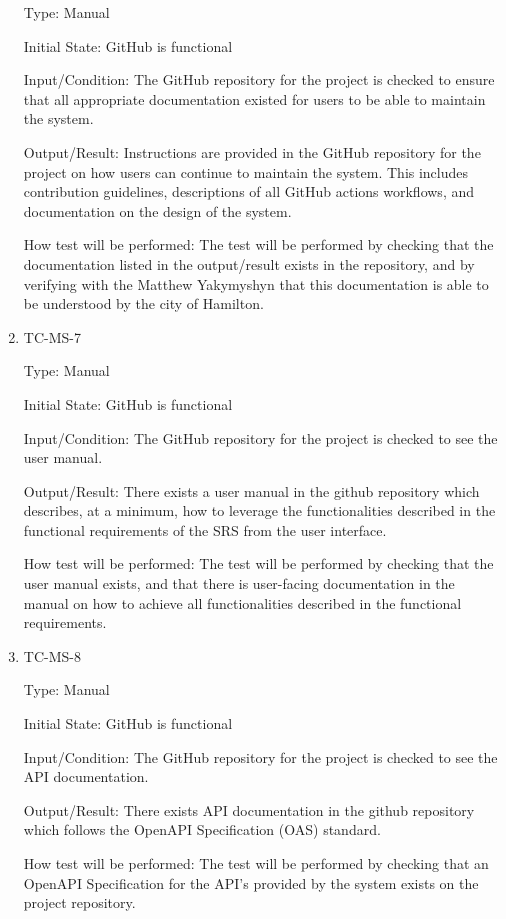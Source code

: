 \documentclass[12pt, titlepage]{article}
\begin{document}
\begin{enumerate}
    Type: Manual

    Initial State: GitHub is functional

    Input/Condition: The GitHub repository for the project is checked
    to ensure that all appropriate documentation existed for users to
    be able to maintain the system.

    Output/Result: Instructions are provided in the GitHub repository
    for the project on how users can continue to maintain the system.
    This includes contribution guidelines, descriptions of all
    GitHub actions workflows, and documentation on the design of the system.

    How test will be performed: The test will be performed by
    checking that the documentation listed in the output/result
    exists in the repository, and by verifying with the Matthew
    Yakymyshyn that this documentation is able to be understood by
    the city of Hamilton.

  \item{TC-MS-7\\}

    Type: Manual

    Initial State: GitHub is functional

    Input/Condition: The GitHub repository for the project is checked
    to see the user manual.

    Output/Result: There exists a user manual in the github
    repository which describes, at a minimum, how to leverage the
    functionalities described in the functional requirements of the
    SRS from the user interface.

    How test will be performed: The test will be performed by
    checking that the user manual exists, and that there is
    user-facing documentation in the manual on how to achieve all
    functionalities described in the functional requirements.

  \item{TC-MS-8\\}

    Type: Manual

    Initial State: GitHub is functional

    Input/Condition: The GitHub repository for the project is checked
    to see the API documentation.

    Output/Result: There exists API documentation in the github
    repository which follows the OpenAPI Specification (OAS) standard.

    How test will be performed: The test will be performed by
    checking that an OpenAPI Specification for the API's provided by
    the system exists on the project repository.


\end{enumerate}
\end{document}
